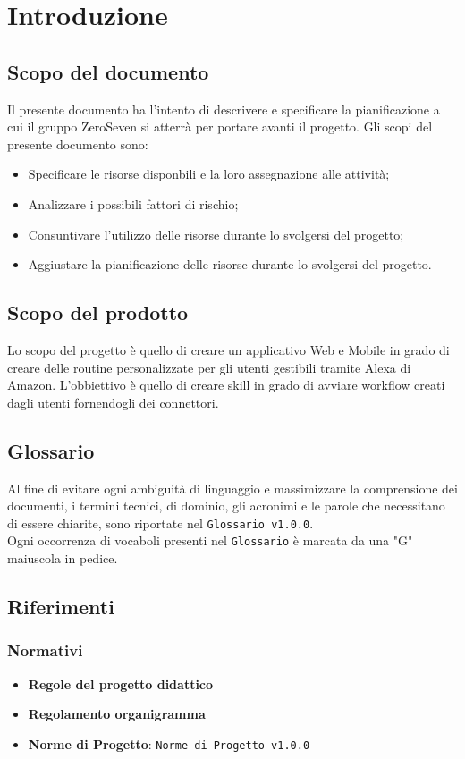 \chapter{Introduzione}
\section{Scopo del documento}
Il presente documento ha l'intento di descrivere e specificare la pianificazione a cui il gruppo ZeroSeven si atterrà per portare avanti il progetto.
Gli scopi del presente documento sono:
\begin{itemize}
	\item Specificare le risorse disponbili e la loro assegnazione alle attività;
	\item Analizzare i possibili fattori di rischio;
	\item Consuntivare l'utilizzo delle risorse durante lo svolgersi del progetto;
	\item Aggiustare la pianificazione delle risorse durante lo svolgersi del progetto.
\end{itemize}
\section{Scopo del prodotto}
Lo scopo del progetto è quello di creare un applicativo Web e Mobile in grado di creare delle routine personalizzate per gli utenti gestibili tramite Alexa di Amazon. L'obbiettivo è quello di creare skill in grado di avviare workflow creati dagli utenti fornendogli dei connettori.
\section{Glossario}
Al fine di evitare ogni ambiguità di linguaggio e massimizzare la comprensione dei documenti, i termini tecnici, di dominio, gli acronimi e le parole che necessitano di essere chiarite, sono riportate nel \texttt{Glossario v1.0.0}.\\
Ogni occorrenza di vocaboli presenti nel \texttt{Glossario} è marcata da una "G" maiuscola in pedice.
\section{Riferimenti}
\subsection{Normativi}
\begin{itemize}
	\item \textbf{Regole del progetto didattico}
	\item  \textbf{Regolamento organigramma}
	\item  \textbf{Norme di Progetto}: \texttt{Norme di Progetto v1.0.0}
\end{itemize}
